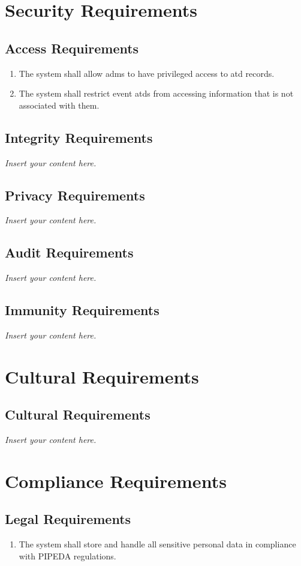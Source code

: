 \documentclass[12pt]{article}
\newcommand{\lips}{\textit{Insert your content here.}}
\begin{document}
\section{Security Requirements}
\subsection{Access Requirements}
\begin{enumerate}[align=left,
  leftmargin=*,
  labelsep=1em,
  itemindent=0em,
  label=\bfseries AC-\arabic*:]
  \item The system shall allow \glspl{adm} to have privileged access to \gls{atd} records.
  \item The system shall restrict event \glspl{atd} from accessing information that is not associated with them.
\end{enumerate}
\subsection{Integrity Requirements}
\lips
\subsection{Privacy Requirements}
\lips
\subsection{Audit Requirements}
\lips
\subsection{Immunity Requirements}
\lips

\section{Cultural Requirements}
\subsection{Cultural Requirements}
\lips

\section{Compliance Requirements}
\subsection{Legal Requirements}
\begin{enumerate}[align=left,
  leftmargin=*,
  labelsep=1em,
  itemindent=0em,
  label=\bfseries LG-\arabic*:]
  \item The system shall store and handle all sensitive personal data in compliance with
    PIPEDA regulations.
\end{enumerate}
\end{document}
